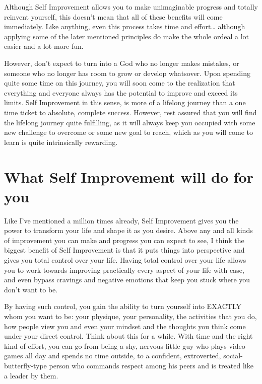 \documentclass[
]{book}
\begin{document}
Although Self Improvement allows you to make unimaginable progress and totally reinvent yourself, this doesn't mean that all of these benefits will come immediately. Like anything, even this process takes time and effort\ldots{} although applying some of the later mentioned principles do make the whole ordeal a lot easier and a lot more fun.

However, don't expect to turn into a God who no longer makes mistakes, or someone who no longer has room to grow or develop whatsover. Upon spending quite some time on this journey, you will soon come to the realization that everything and everyone always has the potential to improve and exceed its limits. Self Improvement in this sense, is more of a lifelong journey than a one time ticket to absolute, complete success. However, rest assured that you will find the lifelong journey quite fulfilling, as it will always keep you occupied with some new challenge to overcome or some new goal to reach, which as you will come to learn is quite intrinsically rewarding.

\hypertarget{what-self-improvement-will-do-for-you}{%
\section{What Self Improvement will do for you}\label{what-self-improvement-will-do-for-you}}

Like I've mentioned a million times already, Self Improvement gives you the power to transform your life and shape it as you desire. Above any and all kinds of improvement you can make and progress you can expect to see, I think the biggest benefit of Self Improvement is that it puts things into perspective and gives you total control over your life. Having total control over your life allows you to work towards improving practically every aspect of your life with ease, and even bypass cravings and negative emotions that keep you stuck where you don't want to be.

By having such control, you gain the ability to turn yourself into EXACTLY whom you want to be: your physique, your personality, the activities that you do, how people view you and even your mindset and the thoughts you think come under your direct control. Think about this for a while. With time and the right kind of effort, you can go from being a shy, nervous little guy who plays video games all day and spends no time outside, to a confident, extroverted, social-butterfly-type person who commands respect among his peers and is treated like a leader by them.
\end{document}
